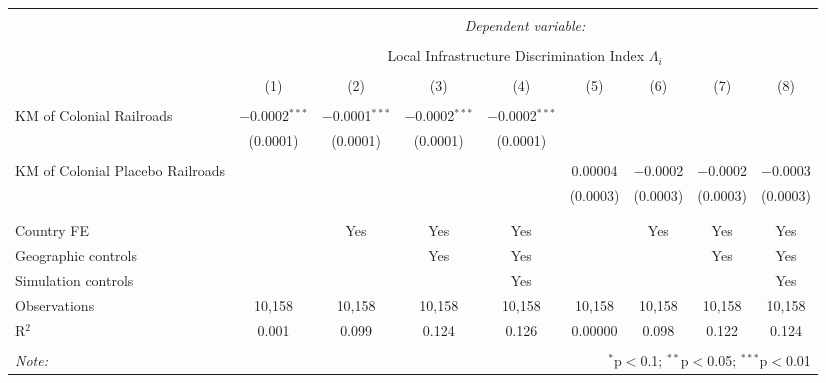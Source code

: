 \documentclass[]{beamer}   	%
\begin{document}
\begin{frame}
\begin{table}[t]
{  \begin{tabular}{@{\extracolsep{5pt}}lcccccccc}
  \\[-1.8ex]\hline
  \hline \\[-1.8ex]
   & \multicolumn{8}{c}{\textit{Dependent variable:}} \\
  \cline{2-9}
  \\[-1.8ex] & \multicolumn{8}{c}{Local Infrastructure Discrimination Index $\Lambda_{i}$} \\
  \\[-1.8ex] & (1) & (2) & (3) & (4) & (5) & (6) & (7) & (8)\\
  \hline \\[-1.8ex]
   KM of Colonial Railroads & $-$0.0002$^{***}$ & $-$0.0001$^{***}$ & $-$0.0002$^{***}$ & $-$0.0002$^{***}$ &  &  &  &  \\
  & (0.0001) & (0.0001) & (0.0001) & (0.0001) &  &  &  &  \\
    & & & & & & & & \\
   KM of Colonial Placebo Railroads &  &  &  &  & 0.00004 & $-$0.0002 & $-$0.0002 & $-$0.0003 \\
  &  &  &  &  & (0.0003) & (0.0003) & (0.0003) & (0.0003) \\
    & & & & & & & & \\
  \hline \\[-1.8ex]
  Country FE &  & Yes & Yes & Yes &  & Yes & Yes & Yes \\
  Geographic controls &  &  & Yes & Yes &  &  & Yes & Yes \\
  Simulation controls &  &  &  & Yes &  &  &  & Yes \\
  Observations & 10,158 & 10,158 & 10,158 & 10,158 & 10,158 & 10,158 & 10,158 & 10,158 \\
  R$^{2}$ & 0.001 & 0.099 & 0.124 & 0.126 & 0.00000 & 0.098 & 0.122 & 0.124 \\
  \hline
  \hline \\[-1.8ex]
  \textit{Note:}  & \multicolumn{8}{r}{$^{*}$p$<$0.1; $^{**}$p$<$0.05; $^{***}$p$<$0.01} \\
  \end{tabular}

}

\end{table}
\end{frame}
\end{document}
